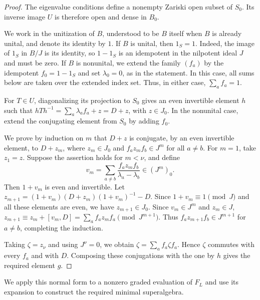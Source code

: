 \documentclass[11pt,reqno]{amsart}
\theoremstyle{definition}
\theoremstyle{remark}
\numberwithin{equation}{section}
\begin{document}
\begin{proof}
The eigenvalue conditions define a nonempty Zariski open
subset of $S_0$. Its inverse image $U$ is therefore open
and dense in $B_0$.


We work in the unitization of $B$, understood to be $B$
itself when $B$ is already unital, and denote its identity
by $1$.
If $B$ is unital, then $1_S=1$. Indeed, the image of $1_S$
in $B/J$ is its identity, so $1-1_S$ is an idempotent
in the nilpotent ideal $J$ and must be zero.
If $B$ is nonunital, we extend the family $(f_a)$ by
the idempotent $f_0=1-1_S$ and set $\lambda_0=0$,
as in the statement. In this case, all sums below
are taken over the extended index set.
Thus, in either case, $\sum_a f_a=1$.



For $T\in U$, diagonalizing its projection to $S_0$
gives an even invertible element $h$ such that
$hTh^{-1}=\sum_a\lambda_a f_a+z=D+z$, with $z\in J_0$.
In the nonunital case, extend the conjugating element
from $S_0$ by adding $f_0$.

We prove by induction on $m$ that $D+z$ is conjugate,
by an even invertible element, to $D+z_m$, where
$z_m\in J_0$ and $f_a z_m f_b\in J^m$ for all $a\ne b$.
For $m=1$, take $z_1=z$.
Suppose the assertion holds for $m<\nu$, and define
\[
v_m=\sum_{a\ne b}
\frac{f_a z_m f_b}{\lambda_a-\lambda_b}
\in(J^m)_0.
\]
Then $1+v_m$ is even and invertible. Let
$z_{m+1}=(1+v_m)(D+z_m)(1+v_m)^{-1}-D$. Since $1+v_m\equiv1\pmod J$ and all these elements are even,
we have $z_{m+1}\in J_0$.
 Since $v_m\in J^m$ and $z_m\in J$,
$
z_{m+1}\equiv z_m+[v_m,D]
=\sum_a f_a z_m f_a
\pmod{J^{m+1}}$.
Thus $f_a z_{m+1}f_b\in J^{m+1}$ for $a\ne b$,
completing the induction.

Taking $\zeta=z_\nu$ and using $J^\nu=0$, we obtain
$\zeta=\sum_a f_a\zeta f_a$.
Hence $\zeta$ commutes with every $f_a$ and with $D$.
Composing these conjugations with the one by $h$
gives the required element $g$.

\end{proof}

We apply this normal form to a nonzero graded evaluation of $F_L$
and use its expansion to construct the required minimal superalgebra.
\end{document}
